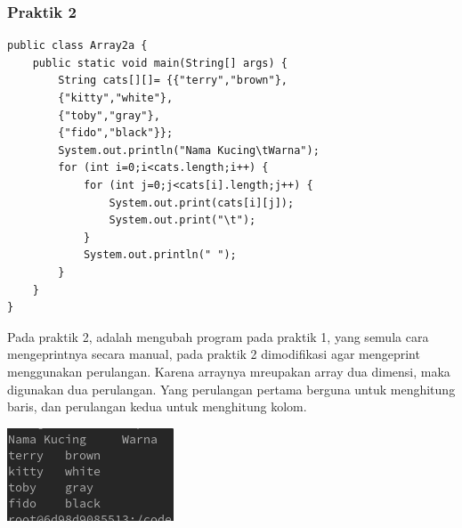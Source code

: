 \documentclass[a4paper,12pt]{article}
\begin{document}
\subsubsection{Praktik 2}
\begin{lstlisting}
public class Array2a {
    public static void main(String[] args) {
        String cats[][]= {{"terry","brown"},
        {"kitty","white"},
        {"toby","gray"},
        {"fido","black"}};
        System.out.println("Nama Kucing\tWarna");
        for (int i=0;i<cats.length;i++) {
            for (int j=0;j<cats[i].length;j++) {
                System.out.print(cats[i][j]);
                System.out.print("\t");
            }
            System.out.println(" ");
        }
    }
}
\end{lstlisting}
Pada praktik 2, adalah mengubah program pada praktik 1, yang semula cara mengeprintnya secara manual, pada praktik 2 dimodifikasi agar mengeprint menggunakan 
perulangan. Karena arraynya mreupakan array dua dimensi, maka digunakan dua perulangan. Yang perulangan pertama berguna untuk menghitung baris, dan perulangan 
kedua untuk menghitung kolom.
\begin{center}
    \includegraphics{2.png}
\end{center}
\end{document}
